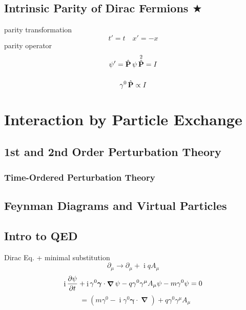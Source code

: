 \documentclass[a4paper]{article}
\DeclareMathOperator{\I}{\mathrm{i}}
\DeclareMathOperator{\ra}{\rightarrow}
\DeclareMathOperator{\na}{\bm{\nabla}}
\DeclareMathOperator{\hH}{\hat{H}}
\DeclareMathOperator{\hP}{\hat{\vb{P}}}          %
\numberwithin{equation}{section}
\begin{document}
\subsection{Intrinsic Parity of Dirac Fermions $ \bigstar $}
parity transformation
\begin{equation}\label{key}
t' = t \quad x' = -x
\end{equation}
parity operator
\begin{equation}\label{key}
\psi' = \hP \psi \hP^2 = I
\end{equation}
\begin{equation}\label{key}
~
\end{equation}



\begin{equation}\label{key}
\gamma^0 \hP \propto I
\end{equation}

\section{Interaction by Particle Exchange}
\subsection{1st and 2nd Order Perturbation Theory}

\subsubsection{Time-Ordered Perturbation Theory}

\subsection{Feynman Diagrams and Virtual Particles}

\subsection{Intro to QED}
Dirac Eq. + minimal substitution
\begin{equation}\label{key}
\partial_\mu \ra \partial_\mu + \I qA_\mu
\end{equation}
\begin{equation}\label{key}
\I\pdv{\psi}{t} + \I\gamma^0 \bm\gamma\cdot\na \psi - q\gamma^0 \gamma^\mu A_\mu \psi - m\gamma^0\psi = 0
\end{equation}
\begin{equation}\label{key}
\hH = (m\gamma^0 - \I\gamma^0\bm\gamma\cdot\na) + q\gamma^0 \gamma^\mu A_\mu
\end{equation}
\end{document}
